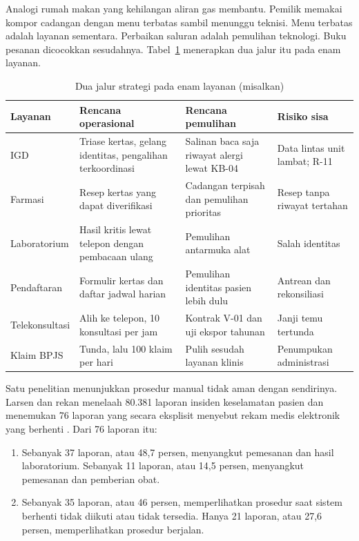 Analogi rumah makan yang kehilangan aliran gas membantu. Pemilik memakai kompor cadangan dengan
menu terbatas sambil menunggu teknisi. Menu terbatas adalah layanan sementara. Perbaikan saluran
adalah pemulihan teknologi. Buku pesanan dicocokkan sesudahnya.
Tabel~\ref{tab:ch10-strategi-layanan} menerapkan dua jalur itu pada enam layanan.

\begin{table}[!htb]
  \centering\small
  \caption{Dua jalur strategi pada enam layanan (misalkan)}\label{tab:ch10-strategi-layanan}
  \begin{tabularx}{\textwidth}{|>{\raggedright\arraybackslash}p{}|>{\raggedright\arraybackslash}X|>{\raggedright\arraybackslash}X|>{\raggedright\arraybackslash}p{}|}
    \hline
    \textbf{Layanan} & \textbf{Rencana operasional} & \textbf{Rencana pemulihan} &
    \textbf{Risiko sisa} \\ \hline
    IGD & Triase kertas, gelang identitas, pengalihan terkoordinasi & Salinan baca saja riwayat
    alergi lewat KB-04 & Data lintas unit lambat; R-11 \\ \hline
    Farmasi & Resep kertas yang dapat diverifikasi & Cadangan terpisah dan pemulihan prioritas &
    Resep tanpa riwayat tertahan \\ \hline
    Laboratorium & Hasil kritis lewat telepon dengan pembacaan ulang & Pemulihan antarmuka alat &
    Salah identitas \\ \hline
    Pendaftaran & Formulir kertas dan daftar jadwal harian & Pemulihan identitas pasien lebih
    dulu & Antrean dan rekonsiliasi \\ \hline
    Telekonsultasi & Alih ke telepon, 10 konsultasi per jam & Kontrak V-01 dan uji ekspor tahunan
    & Janji temu tertunda \\ \hline
    Klaim BPJS & Tunda, lalu 100 klaim per hari & Pulih sesudah layanan klinis & Penumpukan
    administrasi \\ \hline
  \end{tabularx}
\end{table}

Satu penelitian menunjukkan prosedur manual tidak aman dengan sendirinya. Larsen dan rekan menelaah
80.381 laporan insiden keselamatan pasien dan menemukan 76 laporan yang secara eksplisit menyebut
rekam medis elektronik yang berhenti \cite{c10-larsen2018}. Dari 76 laporan itu:
\begin{enumerate}
  \item Sebanyak 37 laporan, atau 48,7 persen, menyangkut pemesanan dan hasil laboratorium.
  Sebanyak 11 laporan, atau 14,5 persen, menyangkut pemesanan dan pemberian obat.
  \item Sebanyak 35 laporan, atau 46 persen, memperlihatkan prosedur saat sistem berhenti tidak
  diikuti atau tidak tersedia. Hanya 21 laporan, atau 27,6 persen, memperlihatkan prosedur
  berjalan.
\end{enumerate}

